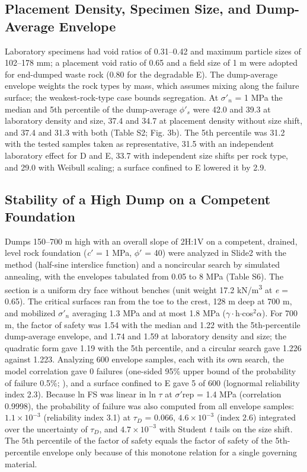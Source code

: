 \documentclass[Journal,letterpaper]{ascelike-new}
\begin{document}
\subsection{Placement Density, Specimen Size, and Dump-Average Envelope}
Laboratory specimens had void ratios of 0.31--0.42 and maximum particle sizes of 102--178 mm; a placement void ratio of 0.65 and a field size of 1 m were adopted for end-dumped waste rock (0.80 for the degradable E). The dump-average envelope weights the rock types by mass, which assumes mixing along the failure surface; the weakest-rock-type case bounds segregation. At $\sigma'_n$ = 1 MPa the median and 5th percentile of the dump-average $\phi'_s$ were 42.0\textdegree{} and 39.3\textdegree{} at laboratory density and size, 37.4\textdegree{} and 34.7\textdegree{} at placement density without size shift, and 37.4\textdegree{} and 31.3\textdegree{} with both (Table S2; Fig. 3b). The 5th percentile was 31.2\textdegree{} with the tested samples taken as representative, 31.5\textdegree{} with an independent laboratory effect for D and E, 33.7\textdegree{} with independent size shifts per rock type, and 29.0\textdegree{} with Weibull scaling; a surface confined to E lowered it by 2.9\textdegree{}.

\subsection{Stability of a High Dump on a Competent Foundation}
Dumps 150--700 m high with an overall slope of 2H:1V on a competent, drained, level rock foundation (\textit{c}$'$ = 1 MPa, $\phi'$ = 40\textdegree{}) were analyzed in Slide2 \cite{rocscience} with the  method (half-sine interslice function) and a noncircular search by simulated annealing, with the envelopes tabulated from 0.05 to 8 MPa (Table S6). The section is a uniform dry face without benches (unit weight 17.2 kN/m\textsuperscript{3} at \textit{e} = 0.65). The critical surfaces ran from the toe to the crest, 128 m deep at 700 m, and mobilized $\sigma'_n$ averaging 1.3 MPa and at most 1.8 MPa ($\gamma\cdot$h$\cdot$cos$^{2}\alpha$). For 700 m, the factor of safety was 1.54 with the median and 1.22 with the 5th-percentile dump-average envelope, and 1.74 and 1.59 at laboratory density and size; the quadratic form gave 1.19 with the 5th percentile, and a circular search gave 1.226 against 1.223. Analyzing 600 envelope samples, each with its own search, the model correlation gave 0 failures (one-sided 95\% upper bound of the probability of failure 0.5\%; ), and a surface confined to E gave 5 of 600 (lognormal reliability index 2.3). Because ln FS was linear in ln $\tau$ at $\sigma'$rep = 1.4 MPa (correlation 0.9998), the probability of failure was also computed from all envelope samples: $1.1\times 10^{-3}$ (reliability index 3.1) at $\tau_D$ = 0.066, $4.6\times 10^{-3}$ (index 2.6) integrated over the uncertainty of $\tau_D$, and $4.7\times 10^{-3}$ with Student \textit{t} tails on the size shift. The 5th percentile of the factor of safety equals the factor of safety of the 5th-percentile envelope only because of this monotone relation for a single governing material.
\end{document}
